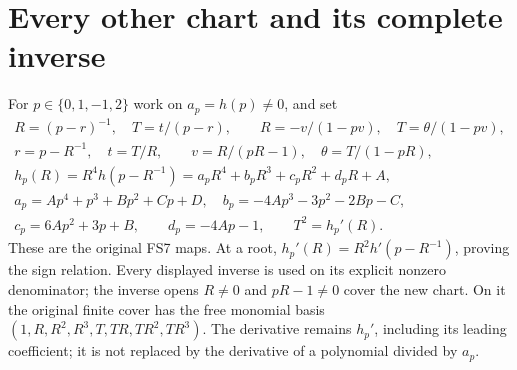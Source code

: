 \documentclass[11pt]{article}
\begin{document}
\section{Every other chart and its complete inverse}
For $p\in\{0,1,-1,2\}$ work on $a_p=h(p)\ne0$, and set
\begin{equation}
 \begin{gathered}
 R=(p-r)^{-1},\quad T=t/(p-r),\qquad
 R=-v/(1-pv),\quad T=\theta/(1-pv),\\
 r=p-R^{-1},\quad t=T/R,\qquad
 v=R/(pR-1),\quad\theta=T/(1-pR),\\
 h_p(R)=R^4h(p-R^{-1})
        =a_pR^4+b_pR^3+c_pR^2+d_pR+A,\\
 a_p=Ap^4+p^3+Bp^2+Cp+D,\quad
 b_p=-4Ap^3-3p^2-2Bp-C,\\
 c_p=6Ap^2+3p+B,\qquad d_p=-4Ap-1,\qquad
 T^2=h_p'(R).
 \end{gathered}
 \tag{GB4}
\end{equation}
These are the original FS7 maps. At a root,
$h_p'(R)=R^2h'(p-R^{-1})$, proving the sign relation.
Every displayed inverse is used on its explicit nonzero
denominator; the inverse opens $R\ne0$ and $pR-1\ne0$
cover the new chart. On it the original finite cover has
the free monomial basis $(1,R,R^2,R^3,T,TR,TR^2,TR^3)$.
The derivative remains $h_p'$, including its leading
coefficient; it is not replaced by the derivative of a
polynomial divided by $a_p$.
\end{document}
